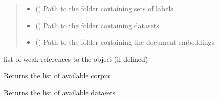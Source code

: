 \documentclass[letterpaper,10pt,english]{sphinxmanual}
\begin{document}
\begin{fulllineitems}
\begin{fulllineitems}
\begin{quote}
\begin{description}
\begin{itemize}
\item {} 
\sphinxAtStartPar
{} () \textendash{} Path to the folder containing sets of labels

\item {} 
\sphinxAtStartPar
{} () \textendash{} Path to the folder containing datasets

\item {} 
\sphinxAtStartPar
{} () \textendash{} Path to the folder containing the document embeddings

\end{itemize}

\end{description}\end{quote}

\end{fulllineitems}


\begin{fulllineitems}
\label{\detokenize{dc_data_manager:src.data_manager.DataManager.__weakref__}}
\sphinxAtStartPar
list of weak references to the object (if defined)

\end{fulllineitems}


\begin{fulllineitems}
\label{\detokenize{dc_data_manager:src.data_manager.DataManager.get_corpus_list}}
\sphinxAtStartPar
Returns the list of available corpus

\end{fulllineitems}


\begin{fulllineitems}
\label{\detokenize{dc_data_manager:src.data_manager.DataManager.get_dataset_list}}
\sphinxAtStartPar
Returns the list of available datasets


\end{fulllineitems}
\end{fulllineitems}
\end{document}
